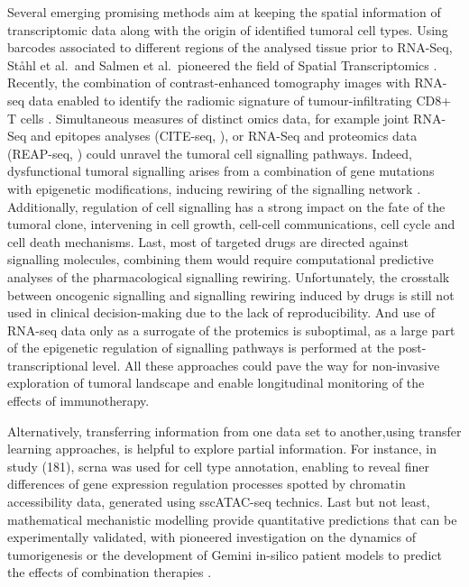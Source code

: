 Several emerging promising methods aim at keeping the spatial
information of transcriptomic data along with the origin of identified
tumoral cell types. Using barcodes associated to different regions of
the analysed tissue prior to RNA-Seq, Ståhl et al.~and Salmen et
al.~pioneered the field of Spatial Transcriptomics
\autocite{salmen_etal18}. Recently, the
combination of contrast-enhanced tomography images with RNA-seq data
enabled to identify the radiomic signature of tumour-infiltrating CD8+ T
cells \autocite{sun_etal18}.
Simultaneous measures of distinct omics data, for example joint \acrshort{RNA-Seq}
and epitopes analyses (CITE-seq,
\autocite{stoeckius_etal17}), or
\acrshort{RNA-Seq} and proteomics data (REAP-seq,
\autocite{peterson_etal17}) could
unravel the tumoral cell signalling pathways. Indeed, dysfunctional
tumoral signalling arises from a combination of gene mutations with
epigenetic modifications, inducing rewiring of the signalling network \autocite{yaffe19}.
Additionally, regulation of cell signalling has a strong impact on the
fate of the tumoral clone, intervening in cell growth, cell-cell communications, cell cycle and cell death mechanisms. Last, most of
targeted drugs are directed against signalling molecules, combining them
would require computational predictive analyses of the pharmacological
signalling rewiring. Unfortunately, the crosstalk between oncogenic
signalling and signalling rewiring induced by drugs is still not used in
clinical decision-making due to the lack of reproducibility. And use of
RNA-seq data only as a surrogate of the protemics is suboptimal, as a
large part of the epigenetic regulation of signalling pathways is
performed at the post-transcriptional level. All these approaches could pave the way for non-invasive exploration of tumoral landscape and enable longitudinal monitoring of the effects of immunotherapy.

Alternatively, transferring information from one data set to another,using transfer learning approaches, is helpful to explore partial information. For instance, in study (181),  \acrshort{scrna} was used for cell
type annotation, enabling to reveal finer differences of gene expression
regulation processes spotted by chromatin accessibility data, generated
using sscATAC-seq technics. Last but not least, mathematical mechanistic
modelling provide quantitative predictions that can be experimentally
validated, with pioneered investigation on the dynamics of
tumorigenesis \autocite{iwami_etal12} or the development of Gemini in-silico patient models to predict the effects of combination therapies \autocite{kather_etal18}.



